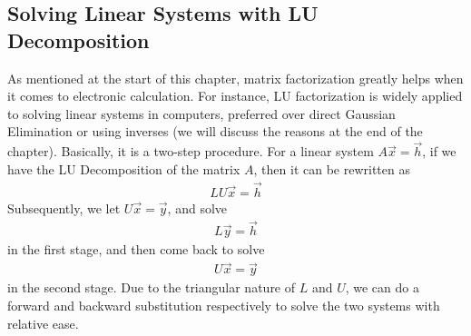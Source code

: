 \subsection{Solving Linear Systems with LU Decomposition}
As mentioned at the start of this chapter, matrix factorization greatly helps when it comes to electronic calculation. For instance, LU factorization is widely applied to solving linear systems in computers, preferred over direct Gaussian Elimination or using inverses (we will discuss the reasons at the end of the chapter). Basically, it is a two-step procedure. For a linear system $A\vec{x} = \vec{h}$, if we have the LU Decomposition of the matrix $A$, then it can be rewritten as 
\begin{align}
LU\vec{x} = \vec{h}    
\end{align}
Subsequently, we let $U\vec{x} = \vec{y}$, and solve 
\begin{align}
L\vec{y} = \vec{h}
\end{align}
in the first stage, and then come back to solve 
\begin{align}
U\vec{x} = \vec{y}
\end{align}
in the second stage. Due to the triangular nature of $L$ and $U$, we can do a forward and backward substitution respectively to solve the two systems with relative ease.
